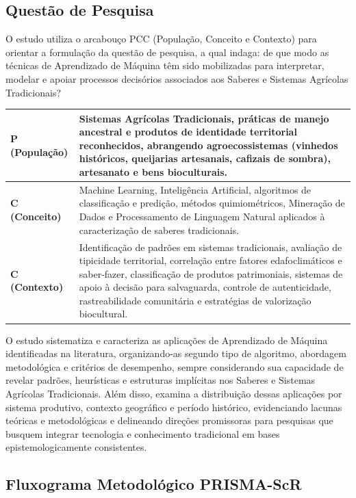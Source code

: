 \subsection{Questão de Pesquisa}

O estudo utiliza o arcabouço PCC (População, Conceito e Contexto) para orientar a formulação da questão de pesquisa, a qual indaga: de que modo as técnicas de Aprendizado de Máquina têm sido mobilizadas para interpretar, modelar e apoiar processos decisórios associados aos Saberes e Sistemas Agrícolas Tradicionais?


\begin{table}[h]
\centering
\small
\begin{tabular}{|p{2.5cm}|p{12cm}|}
\hline
\textbf{P (População)} & Sistemas Agrícolas Tradicionais, práticas de manejo ancestral e produtos de identidade territorial reconhecidos, abrangendo agroecossistemas (vinhedos históricos, queijarias artesanais, cafizais de sombra), artesanato e bens bioculturais. \\ \hline
\textbf{C (Conceito)} & Machine Learning, Inteligência Artificial, algoritmos de classificação e predição, métodos quimiométricos, Mineração de Dados e Processamento de Linguagem Natural aplicados à caracterização de saberes tradicionais. \\ \hline
\textbf{C (Contexto)} & Identificação de padrões em sistemas tradicionais, avaliação de tipicidade territorial, correlação entre fatores edafoclimáticos e saber-fazer, classificação de produtos patrimoniais, sistemas de apoio à decisão para salvaguarda, controle de autenticidade, rastreabilidade comunitária e estratégias de valorização biocultural. \\ \hline
\end{tabular}
\end{table}

O estudo sistematiza e caracteriza as aplicações de Aprendizado de Máquina identificadas na literatura, organizando-as segundo tipo de algoritmo, abordagem metodológica e critérios de desempenho, sempre considerando sua capacidade de revelar padrões, heurísticas e estruturas implícitas nos Saberes e Sistemas Agrícolas Tradicionais. Além disso, examina a distribuição dessas aplicações por sistema produtivo, contexto geográfico e período histórico, evidenciando lacunas teóricas e metodológicas e delineando direções promissoras para pesquisas que busquem integrar tecnologia e conhecimento tradicional em bases epistemologicamente consistentes.


\subsection{Fluxograma Metodológico PRISMA-ScR}

